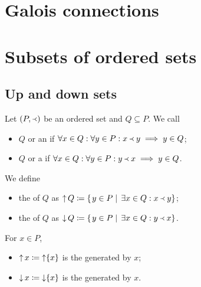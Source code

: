 \section{Galois connections}


\section{Subsets of ordered sets}
\subsection{Up and down sets}
\begin{definition}
Let $\left( P, \Yleft \right)$ be an ordered set and $Q\subseteq P$. We call
\begin{itemize}
\item $Q$  or an  if $\forall x\in Q: \forall y\in P: x\Yleft y \implies y\in Q$;
\item $Q$  or a  if $\forall x\in Q: \forall y\in P: y\Yleft x \implies y\in Q$.
\end{itemize}
We define
\begin{itemize}
\item the  of $Q$ as $\mathop{\uparrow} Q \coloneqq \left\{\left. y\in P \;\right|\; \exists x\in Q: x\Yleft y \right\}$;
\item the  of $Q$ as $\mathop{\downarrow} Q \coloneqq \left\{\left. y\in P \;\right|\; \exists x\in Q: y\Yleft x \right\}$.
\end{itemize}
For $x\in P$,
\begin{itemize}
\item $\mathop{\uparrow} x \coloneqq \mathop{\uparrow}\{x\}$ is the  generated by $x$;
\item $\mathop{\downarrow} x \coloneqq \mathop{\downarrow}\{x\}$ is the  generated by $x$.
\end{itemize}
\end{definition}


